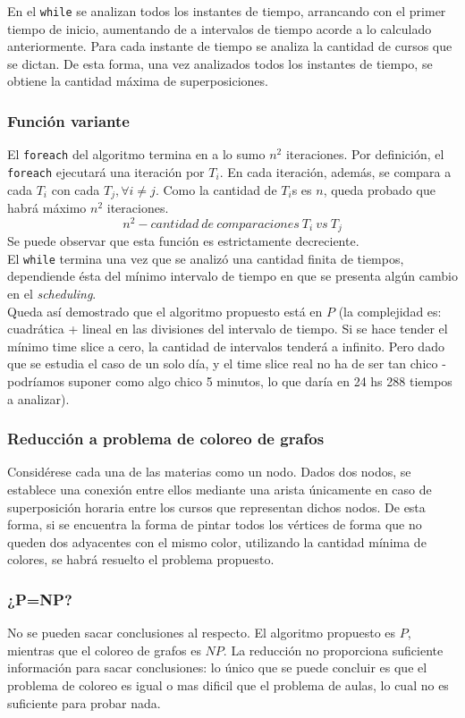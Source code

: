 \documentclass{article}
\begin{document}
En el \texttt{while} se analizan todos los instantes de tiempo, arrancando con el primer tiempo de inicio, aumentando de a intervalos de tiempo acorde a lo calculado anteriormente. Para cada instante de tiempo se analiza la cantidad de cursos que se dictan. De esta forma, una vez analizados todos los instantes de tiempo, se obtiene la cantidad máxima de superposiciones.

\subsubsection{Función variante}
El \texttt{foreach} del algoritmo termina en a lo sumo $n^2$ iteraciones. Por definición, el \texttt{foreach} ejecutará una iteración por $T_i$. En cada iteración, además, se compara a cada $T_i$ con cada $T_j, \forall i\neq j$. Como la cantidad de $T_i$s es $n$, queda probado que habrá máximo $n^2$ iteraciones.
\begin{equation}
    n^2 - cantidad\ de\ comparaciones\ T_i\ vs\ T_j
\end{equation}
Se puede observar que esta función es estrictamente decreciente.\\

El \texttt{while} termina una vez que se analizó una cantidad finita de tiempos, dependiende ésta del mínimo intervalo de tiempo en que se presenta algún cambio en el \textit{scheduling}.\\

Queda así demostrado que el algoritmo propuesto está en $P$ (la complejidad es: cuadrática + lineal en las divisiones del intervalo de tiempo. Si se hace tender el mínimo time slice a cero, la cantidad de intervalos tenderá a infinito. Pero dado que se estudia el caso de un solo día, y el time slice real no ha de ser tan chico - podríamos suponer como algo chico 5 minutos, lo que daría en 24 hs 288 tiempos a analizar).
\subsubsection{Reducción a problema de coloreo de grafos}
Considérese cada una de las materias como un nodo. Dados dos nodos, se establece una conexión entre ellos mediante una arista únicamente en caso de superposición horaria entre los cursos que representan dichos nodos. De esta forma, si se encuentra la forma de pintar todos los vértices de forma que no queden dos adyacentes con el mismo color, utilizando la cantidad mínima de colores, se habrá resuelto el problema propuesto.
\subsubsection{¿P=NP?}
No se pueden sacar conclusiones al respecto. El algoritmo propuesto es $P$, mientras que el coloreo de grafos es $NP$. La reducción no proporciona suficiente información para sacar conclusiones: lo único que se puede concluir es que el problema de coloreo es igual o mas dificil que el problema de aulas, lo cual no es suficiente para probar nada.
\end{document}
